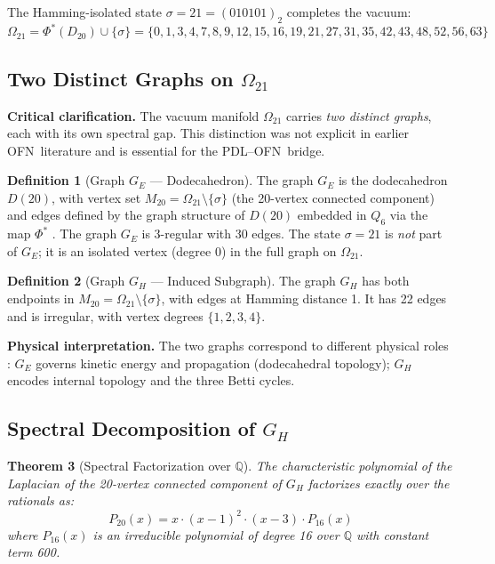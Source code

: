\documentclass[11pt,a4paper]{article}
\theoremstyle{plain}
\newtheorem{theorem}{Theorem}[section]
\theoremstyle{definition}
\newtheorem{definition}[theorem]{Definition}
\theoremstyle{remark}
\newcommand{\PDL}{\textnormal{PDL}}
\newcommand{\OFN}{\textnormal{OFN}}
\begin{document}
The Hamming-isolated state $\sigma = 21 = (010101)_2$ completes the vacuum:
\[
\Omega_{21} = \Phi^*(D_{20}) \cup \{\sigma\} = \{0,1,3,4,7,8,9,12,15,16,19,21,27,31,35,42,43,48,52,56,63\}
\]

\subsection{Two Distinct Graphs on \texorpdfstring{$\Omega_{21}$}{Omega21}}
\label{sec:two_graphs}

\textbf{Critical clarification.} The vacuum manifold $\Omega_{21}$ carries \textit{two distinct graphs}, each with its own spectral gap. This distinction was not explicit in earlier \OFN\ literature and is essential for the \PDL--\OFN\ bridge.

\begin{definition}[Graph $G_E$ --- Dodecahedron]
\label{def:GE}
The graph $G_E$ is the dodecahedron $D(20)$, with vertex set $M_{20} = \Omega_{21} \setminus \{\sigma\}$ (the 20-vertex connected component) and edges defined by the graph structure of $D(20)$ embedded in $Q_6$ via the map $\Phi^*$ \cite{Bachani2026}. The graph $G_E$ is 3-regular with 30 edges. The state $\sigma = 21$ is \textit{not} part of $G_E$; it is an isolated vertex (degree 0) in the full graph on $\Omega_{21}$.
\end{definition}

\begin{definition}[Graph $G_H$ --- Induced Subgraph]
\label{def:GH}
The graph $G_H$ has both endpoints in $M_{20} = \Omega_{21} \setminus \{\sigma\}$, with edges at Hamming distance 1. It has 22 edges and is irregular, with vertex degrees $\{1, 2, 3, 4\}$.
\end{definition}

\textbf{Physical interpretation.} The two graphs correspond to different physical roles \cite{Bachani2026}: $G_E$ governs kinetic energy and propagation (dodecahedral topology); $G_H$ encodes internal topology and the three Betti cycles.

\subsection{Spectral Decomposition of \texorpdfstring{$G_H$}{GH}}
\label{sec:spectral_GH}

\begin{theorem}[Spectral Factorization over $\mathbb{Q}$]
\label{thm:spectral_factorization}
The characteristic polynomial of the Laplacian of the 20-vertex connected component of $G_H$ factorizes exactly over the rationals as:
\[
P_{20}(x) = x \cdot (x - 1)^2 \cdot (x - 3) \cdot P_{16}(x)
\]
where $P_{16}(x)$ is an irreducible polynomial of degree 16 over $\mathbb{Q}$ with constant term 600.
\end{theorem}
\end{document}
